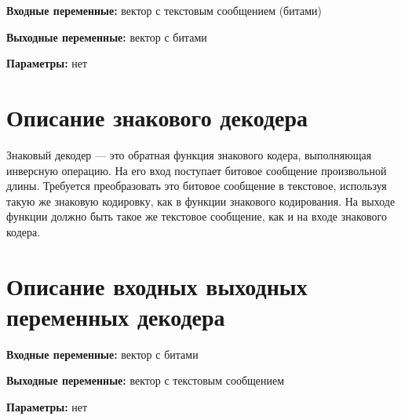 \textbf{Входные переменные:}  вектор с текстовым сообщением (битами)

\textbf{Выходные переменные:} вектор с битами

\textbf{Параметры:} нет


\section{Описание знакового декодера}
Знаковый декодер — это обратная функция знакового кодера, выполняющая инверсную операцию. 
На его вход поступает битовое сообщение произвольной длины. Требуется преобразовать это битовое сообщение в текстовое, 
используя такую же знаковую кодировку, как в функции
знакового кодирования. На выходе функции должно быть такое же текстовое сообщение, как и на входе знакового кодера.

\noindent
[\dotfill]

\section{Описание входных выходных переменных декодера}

\textbf{Входные переменные:}  вектор с битами

\textbf{Выходные переменные:} вектор с текстовым сообщением

\textbf{Параметры:} нет









